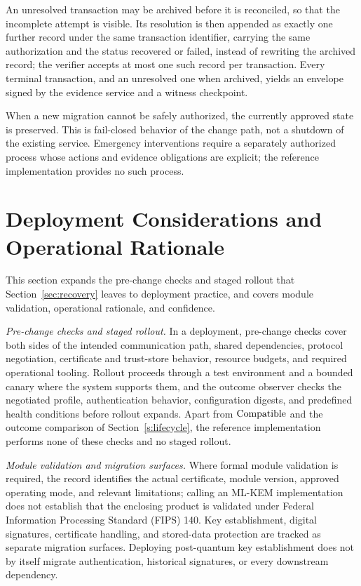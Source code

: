 An unresolved transaction may be archived before it is reconciled, so that the incomplete attempt is visible. Its resolution is then appended as exactly one further record under the same transaction identifier, carrying the same authorization and the status recovered or failed, instead of rewriting the archived record; the verifier accepts at most one such record per transaction. Every terminal transaction, and an unresolved one when archived, yields an envelope signed by the evidence service and a witness checkpoint.

When a new migration cannot be safely authorized, the currently approved state is preserved. This is fail-closed behavior of the change path, not a shutdown of the existing service. Emergency interventions require a separately authorized process whose actions and evidence obligations are explicit; the reference implementation provides no such process.

\section{Deployment Considerations and Operational Rationale}
\label{s:rationale}
This section expands the pre-change checks and staged rollout that Section~\ref{sec:recovery} leaves to deployment practice, and covers module validation, operational rationale, and confidence.

\emph{Pre-change checks and staged rollout.} In a deployment, pre-change checks cover both sides of the intended communication path, shared dependencies, protocol negotiation, certificate and trust-store behavior, resource budgets, and required operational tooling. Rollout proceeds through a test environment and a bounded canary where the system supports them, and the outcome observer checks the negotiated profile, authentication behavior, configuration digests, and predefined health conditions before rollout expands. Apart from $\mathrm{Compatible}$ and the outcome comparison of Section~\ref{s:lifecycle}, the reference implementation performs none of these checks and no staged rollout.

\emph{Module validation and migration surfaces.} Where formal module validation is required, the record identifies the actual certificate, module version, approved operating mode, and relevant limitations; calling an ML-KEM implementation does not establish that the enclosing product is validated under Federal Information Processing Standard (FIPS) 140. Key establishment, digital signatures, certificate handling, and stored-data protection are tracked as separate migration surfaces. Deploying post-quantum key establishment does not by itself migrate authentication, historical signatures, or every downstream dependency.

